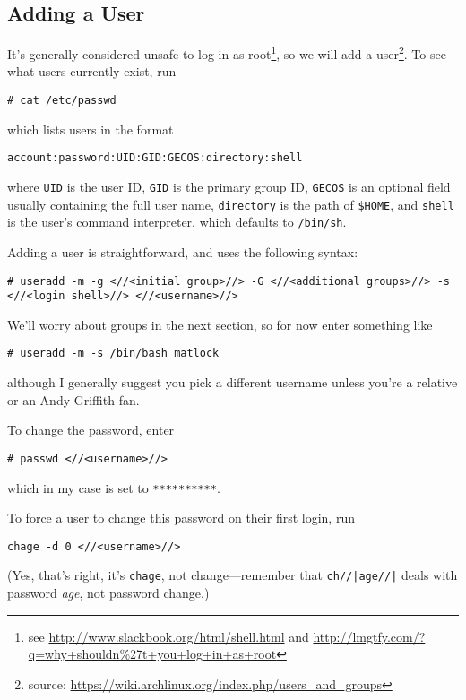 \documentclass[12pt,letterpaper]{article}
\begin{document}
\subsection{Adding a User}

It's generally considered unsafe to log in as root\footnote{see \url{http://www.slackbook.org/html/shell.html} and \url{http://lmgtfy.com/?q=why+shouldn\%27t+you+log+in+as+root}}, so we will add a user\footnote{source: \url{https://wiki.archlinux.org/index.php/users_and_groups}}.  To see what users currently exist, run

\begin{lstlisting}
# cat /etc/passwd
\end{lstlisting}
which lists users in the format
\begin{lstlisting}
account:password:UID:GID:GECOS:directory:shell
\end{lstlisting}
where \lstinline{UID} is the user ID, \lstinline{GID} is the primary group ID, \lstinline{GECOS} is an optional field usually containing the full user name, \lstinline{directory} is the path of \lstinline{$HOME}, and \lstinline{shell} is the user's command interpreter, which defaults to \lstinline{/bin/sh}.

Adding a user is straightforward, and uses the following syntax:

\begin{lstlisting}
# useradd -m -g <//<initial group>//> -G <//<additional groups>//> -s <//<login shell>//> <//<username>//>
\end{lstlisting}
We'll worry about groups in the next section, so for now enter something like
\begin{lstlisting}
# useradd -m -s /bin/bash matlock
\end{lstlisting}
although I generally suggest you pick a different username unless you're a relative or an Andy Griffith fan.

To change the password, enter
\begin{lstlisting}
# passwd <//<username>//>
\end{lstlisting}
which in my case is set to \lstinline{**********}.

To force a user to change this password on their first login, run
\begin{lstlisting}
chage -d 0 <//<username>//>
\end{lstlisting}
(Yes, that's right, it's \lstinline{chage}, not change---remember that \lstinline{ch//|age//|} deals with password \emph{age}, not password change.)
\end{document}
